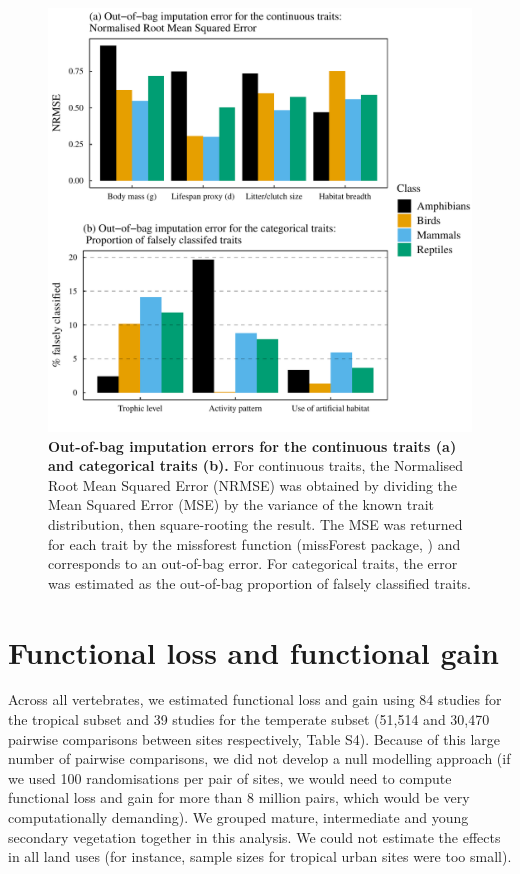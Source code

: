 \begin{figure}[h!]
\centering
\includegraphics[scale=0.8]{Supporting/Chapter3/Figures/SI_imputation_errors}
\caption[Out-of-bag imputation errors for the continuous traits (a) and categorical traits (b)]{\textbf{Out-of-bag imputation errors for the continuous traits (a) and categorical traits (b).} For continuous traits, the Normalised Root Mean Squared Error (NRMSE) was obtained by dividing the Mean Squared Error (MSE) by the variance of the known trait distribution, then square-rooting the result. The MSE was returned for each trait by the missforest function (missForest package, \cite{Stekhoven2012, Stekhoven2016}) and corresponds to an out-of-bag error. For categorical traits, the error was estimated as the out-of-bag proportion of falsely classified traits.}
\label{}
\end{figure}

\newpage

\section{Functional loss and functional gain}

Across all vertebrates, we estimated functional loss and gain using 84 studies for the tropical subset and 39 studies for the temperate subset (51,514 and 30,470 pairwise comparisons between sites respectively, Table S4). Because of this large number of pairwise comparisons, we did not develop a null modelling approach (if we used 100 randomisations per pair of sites, we would need to compute functional loss and gain for more than 8 million pairs, which would be very computationally demanding). We grouped mature, intermediate and young secondary vegetation together in this analysis. We could not estimate the effects in all land uses (for instance, sample sizes for tropical urban sites were too small).

